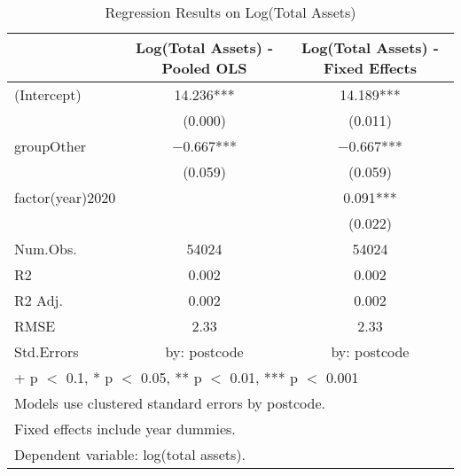 \documentclass[
  12pt,
]{article}
\begin{document}
\begin{table}
\centering
\caption{\label{tab:regression-3a}Regression Results on Log(Total Assets)}
\centering
\begin{tabular}[t]{lcc}
\toprule
  & Log(Total Assets) - Pooled OLS & Log(Total Assets) - Fixed Effects\\
\midrule
(Intercept) & \num{14.236}*** & \num{14.189}***\\
 & (\num{0.000}) & (\num{0.011})\\
groupOther & \num{-0.667}*** & \num{-0.667}***\\
 & (\num{0.059}) & (\num{0.059})\\
factor(year)2020 &  & \num{0.091}***\\
 &  & (\num{0.022})\\
\midrule
Num.Obs. & \num{54024} & \num{54024}\\
R2 & \num{0.002} & \num{0.002}\\
R2 Adj. & \num{0.002} & \num{0.002}\\
RMSE & \num{2.33} & \num{2.33}\\
Std.Errors & by: postcode & by: postcode\\
\bottomrule
\multicolumn{3}{l}{\rule{0pt}{1em}+ p $<$ 0.1, * p $<$ 0.05, ** p $<$ 0.01, *** p $<$ 0.001}\\
\multicolumn{3}{l}{\rule{0pt}{1em}Models use clustered standard errors by postcode.}\\
\multicolumn{3}{l}{\rule{0pt}{1em}Fixed effects include year dummies.}\\
\multicolumn{3}{l}{\rule{0pt}{1em}Dependent variable: log(total assets).}\\
\end{tabular}
\end{table}
\end{document}
